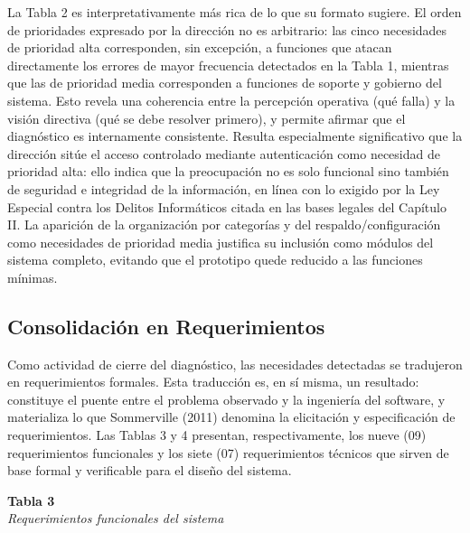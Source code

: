 \documentclass[12pt, letterpaper]{report}
\begin{document}
\vspace{6pt}

La Tabla 2 es interpretativamente más rica de lo que su formato
sugiere. El orden de prioridades expresado por la dirección no es
arbitrario: las cinco necesidades de prioridad alta corresponden, sin
excepción, a funciones que atacan directamente los errores de mayor
frecuencia detectados en la Tabla 1, mientras que las de prioridad
media corresponden a funciones de soporte y gobierno del sistema. Esto
revela una coherencia entre la percepción operativa (qué falla) y la
visión directiva (qué se debe resolver primero), y permite afirmar que
el diagnóstico es internamente consistente. Resulta especialmente
significativo que la dirección sitúe el acceso controlado mediante
autenticación como necesidad de prioridad alta: ello indica que la
preocupación no es solo funcional sino también de seguridad e
integridad de la información, en línea con lo exigido por la Ley
Especial contra los Delitos Informáticos citada en las bases legales
del Capítulo II. La aparición de la organización por categorías y del
respaldo/configuración como necesidades de prioridad media justifica su
inclusión como módulos del sistema completo, evitando que el prototipo
quede reducido a las funciones mínimas.

\subsection{Consolidación en Requerimientos}

Como actividad de cierre del diagnóstico, las necesidades detectadas se
tradujeron en requerimientos formales. Esta traducción es, en sí misma,
un resultado: constituye el puente entre el problema observado y la
ingeniería del software, y materializa lo que Sommerville (2011)
denomina la elicitación y especificación de requerimientos. Las Tablas
3 y 4 presentan, respectivamente, los nueve (09) requerimientos
funcionales y los siete (07) requerimientos técnicos que sirven de base
formal y verificable para el diseño del sistema.

\vspace{6pt}
%
\noindent\textbf{Tabla 3}\\
\textit{Requerimientos funcionales del sistema}
\vspace{4pt}
\end{document}
